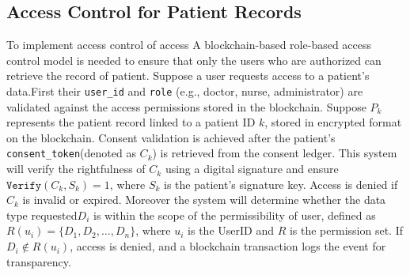 \documentclass[pdflatex,sn-mathphys-num]{sn-jnl}
\theoremstyle{thmstyleone}%
\theoremstyle{thmstyletwo}%
\theoremstyle{thmstylethree}%
\begin{document}




\subsection{Access Control for Patient Records}
To implement access control of access A blockchain-based role-based access control model is needed to ensure that only the users who are authorized can retrieve the record of patient\cite{bib17}. Suppose a user requests access to a patient's data.First their \texttt{user\_id} and \texttt{role} (e.g., doctor, nurse, administrator) are validated against the access permissions stored in the blockchain. Suppose \( P_k \) represents the patient record linked to a patient ID \( k \), stored in encrypted format on the blockchain. Consent validation is achieved after the patient’s \texttt{consent\_token}(denoted as \( C_k \)) is retrieved from the consent ledger. This system will verify the rightfulness of \( C_k \) using a digital signature and ensure \( \texttt{Verify}(C_k, S_k) = 1 \), where \( S_k \) is the patient’s signature key\cite{bib17}. Access is denied if \( C_k \) is invalid or expired. Moreover the system will determine whether the data type requested\( D_i \) is within the scope of the permissibility of user, defined as \( R(u_i) = \{D_1, D_2, \dots, D_n\} \), where \( u_i \) is the UserID and \( R \) is the permission set. If \( D_i \notin R(u_i) \), access is denied, and a blockchain transaction logs the event for transparency. 



\end{document}
